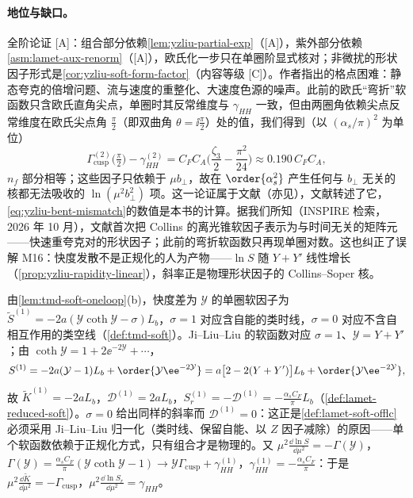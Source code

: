 \paragraph{地位与缺口。}全阶论证 [A]：组合部分依赖\cref{lem:yzliu-partial-exp}（[A]），紫外部分依赖\cref{asm:lamet-aux-renorm}（[A]），欧氏化一步只在单圈阶显式核对；非微扰的形状因子形式是\cref{cor:yzliu-soft-form-factor}（内容等级 [C]）。作者指出的格点困难：静态夸克的倍增问题、流与速度的重整化、大速度色源的噪声\cite{Ji:2019sxk}。此前的欧氏“弯折”软函数\cite{Ji:2014hxa,Ebert:2019okf}只含欧氏直角尖点，单圈时其反常维度与 $\gamma_{HH}$ 一致，但由两圈角依赖尖点反常维度\cite{KorchemskyRadyushkin1987}在欧氏尖点角 $\frac\pi2$（即双曲角 $\theta=\ii\frac\pi2$）处的值，我们得到（以 $(\alpha_s/\pi)^2$ 为单位）%
\begin{equation}\label{eq:yzliu-bent-mismatch}
\Gamma^{(2)}_{\mathrm{cusp}}\big(\tfrac\pi2\big)-\gamma^{(2)}_{HH}=C_FC_A\Big(\frac{\zeta_3}{2}-\frac{\pi^2}{24}\Big)\approx0.190\,C_FC_A ,
\end{equation}
$n_f$ 部分相等；这些因子只依赖于 $\mu b_\perp$，故在 $\order{\alpha_s^2}$ 产生任何与 $b_\perp$ 无关的核都无法吸收的 $\ln(\mu^2b_\perp^2)$ 项。这一论证属于文献\cite{Ji:2019sxk}（亦见\cite{Ji:2019ewn}），文献\cite{Ebert:2022fmh}转述了它，\cref{eq:yzliu-bent-mismatch}的数值是本书的计算。据我们所知（INSPIRE 检索，2026 年 10 月），文献\cite{Ji:2019sxk}首次把 Collins 的离光锥软因子表示为与时间无关的矩阵元——快速重夸克对的形状因子；此前的弯折软函数只再现单圈对数。这也纠正了误解 M16：快度发散不是正规化的人为产物——$\ln S$ 随 $Y+Y'$ 线性增长（\cref{prop:yzliu-rapidity-linear}），斜率正是物理形状因子的 Collins--Soper 核。

\begin{example}[单圈离光锥软函数与 $S_r$]\label{ex:yzliu-soft-oneloop}
由\cref{lem:tmd-soft-oneloop}(b)，快度差为 $\mathcal Y$ 的单圈软因子为 $\tilde S^{(1)}=-2a(\mathcal Y\coth\mathcal Y-\sigma)L_b$，$\sigma=1$ 对应含自能的类时线，$\sigma=0$ 对应不含自相互作用的类空线（\cref{def:tmd-soft}）。Ji--Liu--Liu 的软函数对应 $\sigma=1$、$\mathcal Y=Y+Y'$；由 $\coth\mathcal Y=1+2\ee^{-2\mathcal Y}+\cdots$，%
\begin{equation}\label{eq:yzliu-soft-oneloop}
S^{(1)}=-2a(\mathcal Y-1)L_b+\order{\mathcal Y\ee^{-2\mathcal Y}}=a\big[2-2(Y+Y')\big]L_b+\order{\mathcal Y\ee^{-2\mathcal Y}} ,
\end{equation}
故 $\tilde K^{(1)}=-2aL_b$，$\mathcal D^{(1)}=2aL_b$，$S_r^{(1)}=-\mathcal D^{(1)}=-\frac{\alpha_sC_F}{\pi}L_b$（\cref{def:lamet-reduced-soft}）。$\sigma=0$ 给出同样的斜率而 $\mathcal D^{(1)}=0$：这正是\cref{def:lamet-soft-offlc}必须采用 Ji--Liu--Liu 归一化（类时线、保留自能、以 $Z$ 因子减除）的原因——单个软函数依赖于正规化方式，只有组合才是物理的。又 $\mu^2\frac{\dd\ln S}{\dd\mu^2}=-\Gamma(\mathcal Y)$，$\Gamma(\mathcal Y)=\frac{\alpha_sC_F}{\pi}(\mathcal Y\coth\mathcal Y-1)\to\mathcal Y\Gamma_{\mathrm{cusp}}+\gamma^{(1)}_{HH}$，$\gamma^{(1)}_{HH}=-\frac{\alpha_sC_F}{\pi}$：于是 $\mu^2\frac{\dd\tilde K}{\dd\mu^2}=-\Gamma_{\mathrm{cusp}}$，$\mu^2\frac{\dd\ln S_r}{\dd\mu^2}=\gamma_{HH}$。
\end{example}

